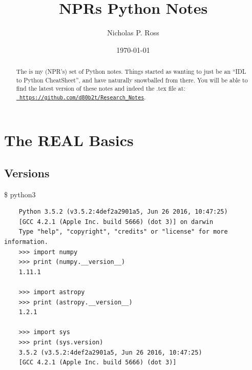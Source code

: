 \documentclass[11pt,a4paper]{article}
\begin{document}
\title{NPRs Python Notes}
\author{Nicholas P. Ross}
\date{\today}
\maketitle




\begin{abstract}
The is my (NPR's) set of Python notes.  Things started as wanting to
just be an ``IDL to Python CheatSheet'', and have naturally snowballed
from there.  You will be able to find the latest version of these notes
and indeed the .tex file at:\\
\href{https://github.com/d80b2t/Research\_Notes}{\tt
https://github.com/d80b2t/Research\_Notes}.
\end{abstract}


\newpage
\tableofcontents


\newpage
\section{The REAL Basics}

    \subsection{Versions}
    \$ python3
    \begin{lstlisting}
    Python 3.5.2 (v3.5.2:4def2a2901a5, Jun 26 2016, 10:47:25) 
    [GCC 4.2.1 (Apple Inc. build 5666) (dot 3)] on darwin
    Type "help", "copyright", "credits" or "license" for more information.
    >>> import numpy 
    >>> print (numpy.__version__)
    1.11.1 

    >>> import astropy 
    >>> print (astropy.__version__)
    1.2.1 
 
    >>> import sys
    >>> print (sys.version)
    3.5.2 (v3.5.2:4def2a2901a5, Jun 26 2016, 10:47:25) 
    [GCC 4.2.1 (Apple Inc. build 5666) (dot 3)]

    \end{lstlisting}
 
\end{document}
